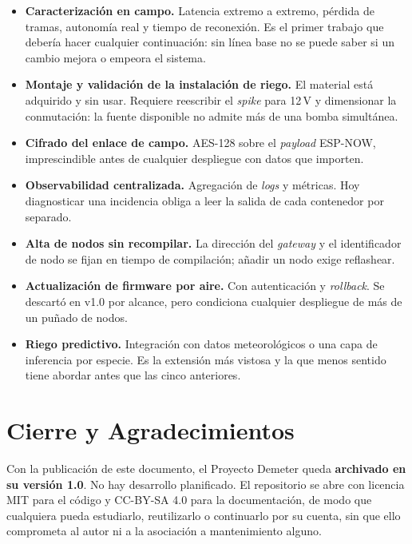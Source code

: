 \begin{itemize}[leftmargin=*, label=--]
    \item \textbf{Caracterización en campo.} Latencia extremo a extremo, pérdida
          de tramas, autonomía real y tiempo de reconexión. Es el primer trabajo
          que debería hacer cualquier continuación: sin línea base no se puede
          saber si un cambio mejora o empeora el sistema.
    \item \textbf{Montaje y validación de la instalación de riego.} El material
          está adquirido y sin usar. Requiere reescribir el \textit{spike} para
          12\,V y dimensionar la conmutación: la fuente disponible no admite más de
          una bomba simultánea.
    \item \textbf{Cifrado del enlace de campo.} AES-128 sobre el \textit{payload}
          ESP-NOW, imprescindible antes de cualquier despliegue con datos que
          importen.
    \item \textbf{Observabilidad centralizada.} Agregación de \textit{logs} y
          métricas. Hoy diagnosticar una incidencia obliga a leer la salida de
          cada contenedor por separado.
    \item \textbf{Alta de nodos sin recompilar.} La dirección del \textit{gateway}
          y el identificador de nodo se fijan en tiempo de compilación; añadir un
          nodo exige reflashear.
    \item \textbf{Actualización de firmware por aire.} Con autenticación y
          \textit{rollback}. Se descartó en v1.0 por alcance, pero condiciona
          cualquier despliegue de más de un puñado de nodos.
    \item \textbf{Riego predictivo.} Integración con datos meteorológicos o una
          capa de inferencia por especie. Es la extensión más vistosa y la que
          menos sentido tiene abordar antes que las cinco anteriores.
\end{itemize}

\section{Cierre y Agradecimientos}

Con la publicación de este documento, el Proyecto Demeter queda \textbf{archivado
en su versión 1.0}. No hay desarrollo planificado. El repositorio se abre con
licencia MIT para el código y CC-BY-SA 4.0 para la documentación, de modo que
cualquiera pueda estudiarlo, reutilizarlo o continuarlo por su cuenta, sin que ello
comprometa al autor ni a la asociación a mantenimiento alguno.

